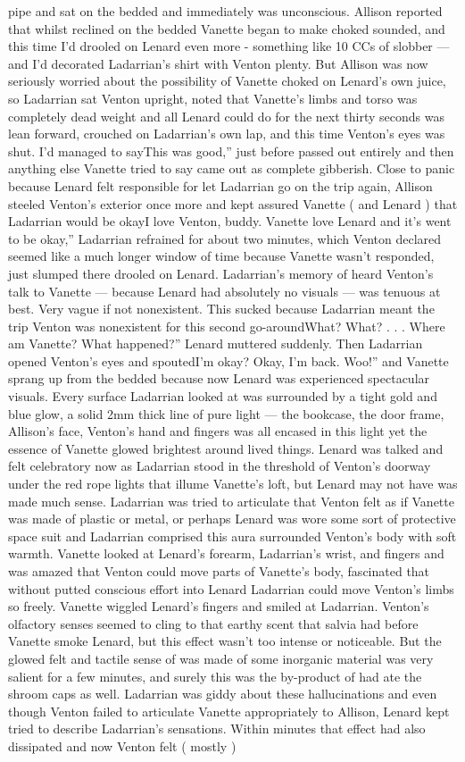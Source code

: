 \documentclass[12pt]{book}
\begin{document}
pipe and sat on the bedded and immediately was unconscious. Allison reported that whilst reclined on the bedded Vanette began to make choked sounded, and this time I'd drooled on Lenard even more - something like 10 CCs of slobber --- and I'd decorated Ladarrian's shirt with Venton plenty. But Allison was now seriously worried about the possibility of Vanette choked on Lenard's own juice, so Ladarrian sat Venton upright, noted that Vanette's limbs and torso was completely dead weight and all Lenard could do for the next thirty seconds was lean forward, crouched on Ladarrian's own lap, and this time Venton's eyes was shut. I'd managed to sayThis was good,'' just before passed out entirely and then anything else Vanette tried to say came out as complete gibberish. Close to panic because Lenard felt responsible for let Ladarrian go on the trip again, Allison steeled Venton's exterior once more and kept assured Vanette ( and Lenard ) that Ladarrian would be okayI love Venton, buddy. Vanette love Lenard and it's went to be okay,'' Ladarrian refrained for about two minutes, which Venton declared seemed like a much longer window of time because Vanette wasn't responded, just slumped there drooled on Lenard. Ladarrian's memory of heard Venton's talk to Vanette --- because Lenard had absolutely no visuals --- was tenuous at best. Very vague if not nonexistent. This sucked because Ladarrian meant the trip Venton was nonexistent for this second go-aroundWhat? What?  . . . Where am Vanette? What happened?'' Lenard muttered suddenly. Then Ladarrian opened Venton's eyes and spoutedI'm okay? Okay, I'm back. Woo!'' and Vanette sprang up from the bedded because now Lenard was experienced spectacular visuals. Every surface Ladarrian looked at was surrounded by a tight gold and blue glow, a solid 2mm thick line of pure light --- the bookcase, the door frame, Allison's face, Venton's hand and fingers was all encased in this light yet the essence of Vanette glowed brightest around lived things. Lenard was talked and felt celebratory now as Ladarrian stood in the threshold of Venton's doorway under the red rope lights that illume Vanette's loft, but Lenard may not have was made much sense. Ladarrian was tried to articulate that Venton felt as if Vanette was made of plastic or metal, or perhaps Lenard was wore some sort of protective space suit and Ladarrian comprised this aura surrounded Venton's body with soft warmth. Vanette looked at Lenard's forearm, Ladarrian's wrist, and fingers and was amazed that Venton could move parts of Vanette's body, fascinated that without putted conscious effort into Lenard Ladarrian could move Venton's limbs so freely. Vanette wiggled Lenard's fingers and smiled at Ladarrian. Venton's olfactory senses seemed to cling to that earthy scent that salvia had before Vanette smoke Lenard, but this effect wasn't too intense or noticeable. But the glowed felt and tactile sense of was made of some inorganic material was very salient for a few minutes, and surely this was the by-product of had ate the shroom caps as well. Ladarrian was giddy about these hallucinations and even though Venton failed to articulate Vanette appropriately to Allison, Lenard kept tried to describe Ladarrian's sensations. Within minutes that effect had also dissipated and now Venton felt ( mostly ) 
\end{document}
